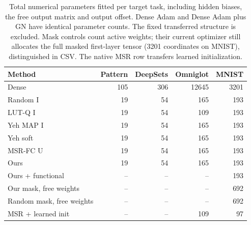 \begin{table}[htbp]\centering\small
\begin{tabular}{lrrrr}\toprule
Method & Pattern & DeepSets & Omniglot & MNIST\\\midrule
Dense & 105 & 306 & 12645 & 3201\\
Random I & 19 & 54 & 165 & 193\\
LUT-Q I & 19 & 54 & 109 & 193\\
Yeh MAP I & 19 & 54 & 165 & 193\\
Yeh soft & 19 & 54 & 165 & 193\\
MSR-FC U & 19 & 54 & 165 & 193\\
Ours & 19 & 54 & 165 & 193\\
Ours + functional & -- & -- & -- & 193\\
Our mask, free weights & -- & -- & -- & 692\\
Random mask, free weights & -- & -- & -- & 692\\
MSR + learned init & -- & -- & 109 & 97\\
\bottomrule\end{tabular}
\caption{Total numerical parameters fitted per target task, including hidden biases, the free output matrix and output offset. Dense Adam and Dense Adam plus GN have identical parameter counts. The fixed transferred structure is excluded. Mask controls count active weights; their current optimizer still allocates the full masked first-layer tensor (3201 coordinates on MNIST), distinguished in CSV. The native MSR row transfers learned initialization.}
\label{tab:benchmark-parameters}\end{table}
